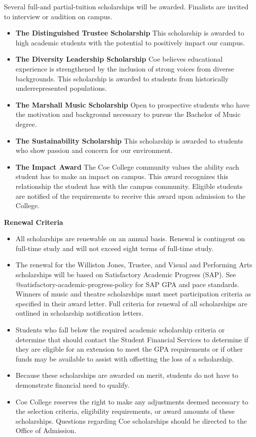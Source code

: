 \documentclass[
  letterpaper,
]{scrbook}
\providecommand{\tightlist}{%
  \setlength{\itemsep}{0pt}\setlength{\parskip}{0pt}}
\begin{document}
Several full-and partial-tuition scholarships will be awarded. Finalists
are invited to interview or audition on campus.

\begin{itemize}
\tightlist
\item
  \textbf{The Distinguished Trustee Scholarship} This scholarship is
  awarded to high academic students with the potential to positively
  impact our campus.
\item
  \textbf{The Diversity Leadership Scholarship} Coe believes educational
  experience is strengthened by the inclusion of strong voices from
  diverse backgrounds. This scholarship is awarded to students from
  historically underrepresented populations.
\item
  \textbf{The Marshall Music Scholarship} Open to prospective students
  who have the motivation and background necessary to pursue the
  Bachelor of Music degree.
\item
  \textbf{The Sustainability Scholarship} This scholarship is awarded to
  students who show passion and concern for our environment.
\item
  \textbf{The Impact Award} The Coe College community values the ability
  each student has to make an impact on campus. This award recognizes
  this relationship the student has with the campus community. Eligible
  students are notified of the requirements to receive this award upon
  admission to the College.
\end{itemize}

\textbf{Renewal Criteria}

\begin{itemize}
\tightlist
\item
  All scholarships are renewable on an annual basis. Renewal is
  contingent on full-time study and will not exceed eight terms of
  full-time study.
\item
  The renewal for the Williston Jones, Trustee, and Visual and
  Performing Arts scholarships will be based on Satisfactory Academic
  Progress (SAP). See @satisfactory-academic-progress-policy for SAP GPA
  and pace standards. Winners of music and theatre scholarships must
  meet participation criteria as specified in their award letter. Full
  criteria for renewal of all scholarships are outlined in scholarship
  notification letters.
\item
  Students who fall below the required academic scholarship criteria or
  determine that should contact the Student Financial Services to
  determine if they are eligible for an extension to meet the GPA
  requirements or if other funds may be available to assist with
  offsetting the loss of a scholarship.
\item
  Because these scholarships are awarded on merit, students do not have
  to demonstrate financial need to qualify.
\item
  Coe College reserves the right to make any adjustments deemed
  necessary to the selection criteria, eligibility requirements, or
  award amounts of these scholarships. Questions regarding Coe
  scholarships should be directed to the Office of Admission.
\end{itemize}
\end{document}
